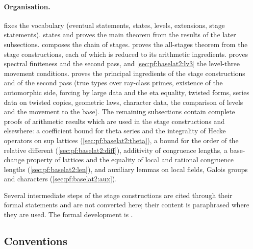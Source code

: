 \paragraph{Organisation.}  fixes the vocabulary (eventual statements,
states, levels, extensions, stage statements).  states and proves the main
theorem from the results of the later subsections.  composes the chain of
stages.  proves the all-stages theorem from the stage constructions,
each of which is reduced to its arithmetic ingredients.  proves spectral
finiteness and the second pass, and \cref{sec:pf:baselat2:lv3} the level-three movement conditions.
 proves the principal ingredients of the stage constructions and of the second
pass (true types over ray-class primes, existence of the automorphic side, forcing by large data and the eta
equality, twisted forms, series data on twisted copies, geometric laws, character data, the comparison of levels
and the movement to the base). The remaining subsections contain complete proofs of arithmetic results which
are used in the stage constructions and elsewhere: a coefficient bound for theta series and the integrality of
Hecke operators on sup lattices (\cref{sec:pf:baselat2:theta}), a bound for the order of the relative different
(\cref{sec:pf:baselat2:diff}), additivity of congruence lengths, a base-change property of lattices and the
equality of local and rational congruence lengths (\cref{sec:pf:baselat2:len}), and auxiliary lemmas on local
fields, Galois groups and characters (\cref{sec:pf:baselat2:aux}).

Several intermediate steps of the stage constructions are cited through their formal statements and
are not converted here; their content is paraphrased where they are used. The formal development is
\cite{LeanSource2026}.

\subsection{Conventions}\label{sec:pf:baselat2:conv}

